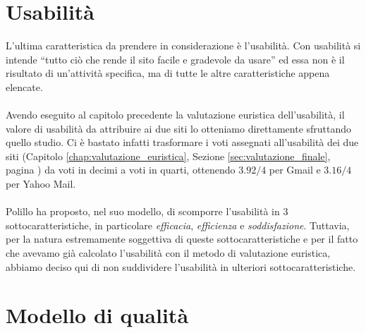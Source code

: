 	\section{Usabilit\`{a}} \label{sec:usabilità}
	
		L'ultima caratteristica da prendere in considerazione è l'usabilità. Con usabilità si intende ``tutto ciò che rende il sito facile e gradevole da usare'' \cite{polillo:modello} ed essa non è il risultato di un'attività specifica,  ma di tutte le altre caratteristiche appena elencate.\\
		\\
		Avendo eseguito al capitolo precedente la valutazione euristica dell'usabilità, il valore di usabilità da attribuire ai due siti lo otteniamo direttamente sfruttando quello studio. Ci è bastato infatti trasformare i voti assegnati all'usabilità dei due siti (Capitolo \ref{chap:valutazione_euristica}, Sezione \ref{sec:valutazione_finale}, pagina \pageref{sec:valutazione_finale}) da voti in decimi a voti in quarti, ottenendo $3.92/4$ per Gmail e $3.16/4$ per Yahoo Mail.\\
		\\
		Polillo ha proposto, nel suo modello, di scomporre l'usabilità in 3 sottocaratteristiche, in particolare \textit{efficacia}, \textit{efficienza} e \textit{soddisfazione}. Tuttavia, per la natura estremamente soggettiva di queste sottocaratteristiche e per il fatto che avevamo già calcolato l'usabilità con il metodo di valutazione euristica,  abbiamo deciso qui di non suddividere l'usabilità in ulteriori sottocaratteristiche.
	
	\section{Modello di qualit\`{a}} \label{sec:modello_qualità}
	
